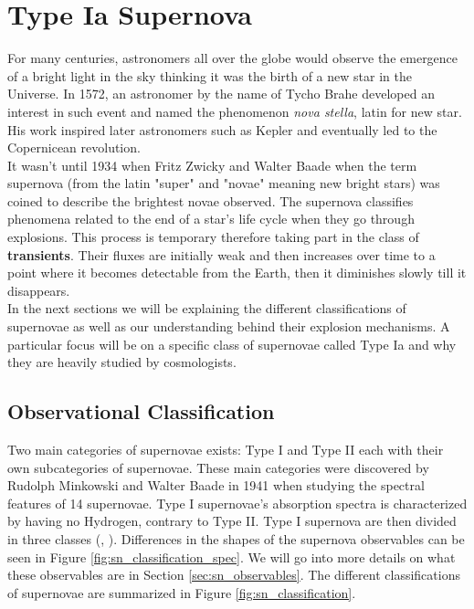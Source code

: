 \section{Type Ia Supernova} \label{sec:sn_ia}

For many centuries, astronomers all over the globe would observe the emergence of a bright light in the sky thinking it was the birth of a new star in the Universe. 
In 1572, an astronomer by the name of Tycho Brahe developed an interest in such event and named the phenomenon \textit{nova stella}, latin for new star. 
His work inspired later astronomers such as Kepler and eventually led to the Copernicean revolution.\\

It wasn't until 1934 when Fritz Zwicky and Walter Baade when the term supernova (from the latin "super" and "novae" meaning new bright stars) was coined to describe the 
brightest novae observed. The supernova classifies phenomena related to the end of a star's life cycle when they go through explosions. This process is temporary therefore 
taking part in the class of \textbf{transients}. Their fluxes are initially weak and then increases over time to a point where it becomes detectable from 
the Earth, then it diminishes slowly till it disappears.\\

In the next sections we will be explaining the different classifications of supernovae as well as our understanding behind their explosion mechanisms. A particular focus 
will be on a specific class of supernovae called Type Ia and why they are heavily studied by cosmologists. \\

\subsection{Observational Classification}

Two main categories of supernovae exists: Type I and Type II each with their own subcategories of supernovae. These main categories were discovered by Rudolph Minkowski and 
Walter Baade in 1941 when studying the spectral features of 14 supernovae. Type I supernovae's absorption spectra is characterized by having no Hydrogen, contrary to Type II. 
Type I supernova are then divided in three classes (\cite{Wheeler_1985, Elias_1985}, \cite{Wheeler_1990}). Differences in the shapes of the supernova observables 
can be seen in Figure \ref{fig:sn_classification_spec}. We will go into more details on what these observables are in Section \ref{sec:sn_observables}. 
The different classifications of supernovae are summarized in Figure \ref{fig:sn_classification}.

